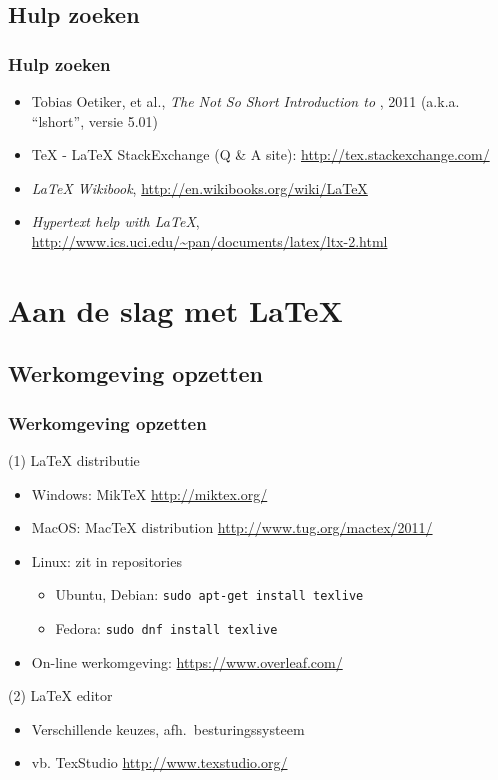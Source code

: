 \documentclass[aspectratio=169]{beamer}
\begin{document}
\subsection{Hulp zoeken}

\begin{frame}
  \frametitle{Hulp zoeken}
  
  \begin{itemize}
    \item Tobias Oetiker, et al., \emph{The Not So Short Introduction to {\LaTeXe}}, 2011 (a.k.a. ``lshort'', versie 5.01)
    \item {\TeX} - {\LaTeX} StackExchange (Q \& A site): \url{http://tex.stackexchange.com/}
    \item \emph{{\LaTeX} Wikibook}, \url{http://en.wikibooks.org/wiki/LaTeX}
    \item \emph{Hypertext help with {\LaTeX}}, \url{http://www.ics.uci.edu/~pan/documents/latex/ltx-2.html}
  \end{itemize}
  
\end{frame}

\section{Aan de slag met {\LaTeX}}

\subsection{Werkomgeving opzetten}

\begin{frame}
  \frametitle{Werkomgeving opzetten}
  
  (1) {\LaTeX} distributie
  
  \begin{itemize}
    \item Windows: MikTeX \url{http://miktex.org/}
    \item MacOS: MacTeX distribution \url{http://www.tug.org/mactex/2011/}
    \item Linux: zit in repositories
    \begin{itemize}
      \item Ubuntu, Debian: \texttt{sudo apt-get install texlive}
      \item Fedora: \texttt{sudo dnf install texlive}
    \end{itemize}
    \item On-line werkomgeving: \url{https://www.overleaf.com/}
  \end{itemize}
  
  (2) {\LaTeX} editor
  
  \begin{itemize}
    \item Verschillende keuzes, afh.~besturingssysteem
    \item vb. TexStudio \url{http://www.texstudio.org/}
  \end{itemize}
\end{frame}
\end{document}

